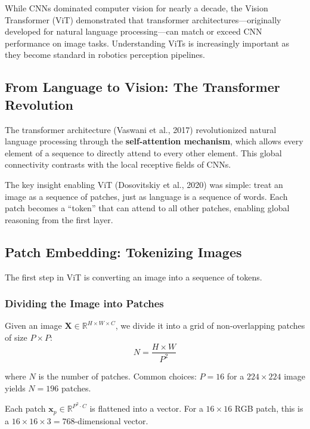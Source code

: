While CNNs dominated computer vision for nearly a decade, the Vision Transformer (ViT) demonstrated that transformer architectures---originally developed for natural language processing---can match or exceed CNN performance on image tasks. Understanding ViTs is increasingly important as they become standard in robotics perception pipelines.

\subsection{From Language to Vision: The Transformer Revolution}

The transformer architecture (Vaswani et al., 2017) revolutionized natural language processing through the \textbf{self-attention mechanism}, which allows every element of a sequence to directly attend to every other element. This global connectivity contrasts with the local receptive fields of CNNs.

The key insight enabling ViT (Dosovitskiy et al., 2020) was simple: treat an image as a sequence of patches, just as language is a sequence of words. Each patch becomes a ``token'' that can attend to all other patches, enabling global reasoning from the first layer.

\subsection{Patch Embedding: Tokenizing Images}

The first step in ViT is converting an image into a sequence of tokens.

\subsubsection{Dividing the Image into Patches}

Given an image $\mathbf{X} \in \mathbb{R}^{H \times W \times C}$, we divide it into a grid of non-overlapping patches of size $P \times P$:
\begin{equation}
N = \frac{H \times W}{P^2}
\label{eq:num_patches}
\end{equation}

where $N$ is the number of patches. Common choices: $P = 16$ for a $224 \times 224$ image yields $N = 196$ patches.

Each patch $\mathbf{x}_p \in \mathbb{R}^{P^2 \cdot C}$ is flattened into a vector. For a $16 \times 16$ RGB patch, this is a $16 \times 16 \times 3 = 768$-dimensional vector.

